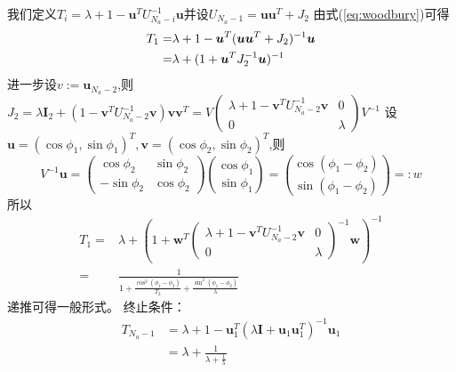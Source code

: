 我们定义$T_i=\lambda+1-\bm{u}^T U_{N_a-i}^{-1}\bm{u}$并设$U_{N_a-1}=\bm{u}\bm{u}^T+J_2$
由式(\ref{eq:woodbury})可得
\begin{align}\notag
T_1=&\lambda+1-\bm{u}^T (\bm{u}\bm{u}^T+J_2)^{-1}\bm{u}\\
=&\lambda+(1+\bm{u}^T J_2^{-1}\bm{u})^{-1}
\end{align}
进一步设$v:=\bm{u}_{N_a-2}$,则$J_2=\lambda \bm{I}_2+(1-\bm{v}^T U_{N_a-2}^{-1}\bm{v})\bm{v}\bm{v}^T=V\begin{pmatrix}
                     \lambda+1-\bm{v}^T U_{N_a-2}^{-1}\bm{v} & 0 \\
                     0 & \lambda
                   \end{pmatrix}V^{-1}$
设$\bm{u}=(\cos\phi_1,\sin\phi_1)^T,\bm{v}=(\cos\phi_2,\sin\phi_2)^T$,则
\[
V^{-1}\bm{u}=\begin{pmatrix}
                     \cos\phi_2 & \sin\phi_2 \\
                     -\sin\phi_2 & \cos\phi_2
                   \end{pmatrix}\binom{\cos\phi_1}{\sin\phi_1}=\binom{\cos(\phi_1-\phi_2)}{\sin(\phi_1-\phi_2)}=:w
\]
所以
\begin{align*}
T_1=&\lambda+(1+\bm{w}^T \begin{pmatrix}
                     \lambda+1-\bm{v}^T U_{N_a-2}^{-1}\bm{v} & 0 \\
                     0 & \lambda
                   \end{pmatrix}^{-1}\bm{w})^{-1}\\
                   =&\frac{1}{1+\frac{\cos^2(\phi_1-\phi_2)}{T_2}+\frac{\sin^2(\phi_1-\phi_2)}{\lambda}}
\end{align*}
递推可得一般形式。
终止条件：
\begin{align*}
T_{N_a-1}&=\lambda+1-\bm{u}_1^T(\lambda\bm{I}+\bm{u}_1\bm{u}_1^T)^{-1}\bm{u}_1\\
&=\lambda+\frac{1}{\lambda+\frac{1}{\lambda}}
\end{align*}
